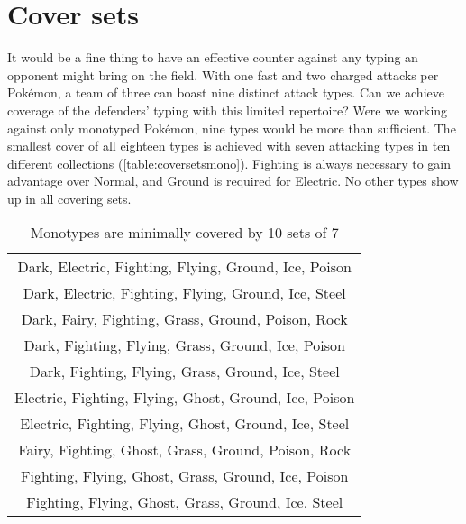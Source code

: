 \section{Cover sets}
\label{sec:coversets}
It would be a fine thing to have an effective counter against any typing
  an opponent might bring on the field.
With one fast and two charged attacks per Pokémon, a team of three can boast nine distinct attack types.
Can we achieve coverage of the defenders' typing with this limited repertoire?
Were we working against only monotyped Pokémon, nine types would be more than sufficient.
The smallest cover of all eighteen types is achieved with seven attacking types in
  ten different collections (\autoref{table:coversetsmono}).
Fighting is always necessary to gain advantage over Normal, and Ground is required for Electric.
No other types show up in all covering sets.
\begin{table}[ht]
\begin{centering}
  \begin{tabular}{c}
 Dark, Electric, Fighting, Flying, Ground, Ice, Poison\\
 Dark, Electric, Fighting, Flying, Ground, Ice, Steel\\
 Dark, Fairy, Fighting, Grass, Ground, Poison, Rock\\
 Dark, Fighting, Flying, Grass, Ground, Ice, Poison\\
 Dark, Fighting, Flying, Grass, Ground, Ice, Steel\\
 Electric, Fighting, Flying, Ghost, Ground, Ice, Poison\\
 Electric, Fighting, Flying, Ghost, Ground, Ice, Steel\\
 Fairy, Fighting, Ghost, Grass, Ground, Poison, Rock\\
 Fighting, Flying, Ghost, Grass, Ground, Ice, Poison\\
 Fighting, Flying, Ghost, Grass, Ground, Ice, Steel\\
  \end{tabular}
  \caption{Monotypes are minimally covered by 10 sets of 7}
  \label{table:coversetsmono}
\end{centering}
\end{table}

